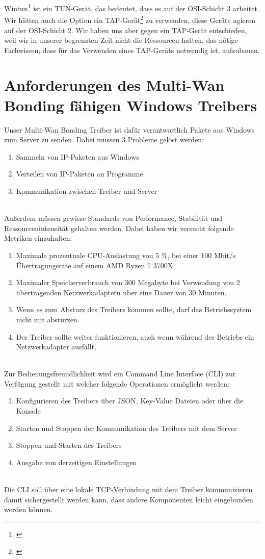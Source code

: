 \newpage
\noindent
Wintun\footnote[1]{\cite[Vgl.][]{1}} ist ein TUN-Gerät, das bedeutet, dass es auf der OSI-Schicht 3 arbeitet. Wir hätten auch die Option ein TAP-Gerät\footnote[2]{\cite[Vgl.][]{28}} zu verwenden, diese Geräte agieren auf der OSI-Schicht 2. Wir haben uns aber gegen ein TAP-Gerät entschieden, weil wir in unserer begrenzten Zeit nicht die Ressourcen hatten, das nötige Fachwissen, dass für das Verwenden eines TAP-Geräts notwendig ist, aufzubauen.

\section{Anforderungen des Multi-Wan Bonding fähigen Windows Treibers}

Unser Multi-Wan Bonding Treiber ist dafür verantwortlich Pakete aus Windows zum Server zu senden. Dabei müssen 3 Probleme gelöst werden:
\\
\begin{enumerate}
    \item Sammeln von IP-Paketen aus Windows
    \item Verteilen von IP-Paketen an Programme
    \item Kommunikation zwischen Treiber und Server
\end{enumerate}
\ \\
Außerdem müssen gewisse Standards von Performance, Stabilität und Ressourcenintensität gehalten werden. Dabei haben wir versucht folgende Metriken einzuhalten:
\\
\begin{enumerate}
    \item Maximale prozentuale CPU-Auslastung von 5 \%, bei einer 100 Mbit/s Übertragungsrate auf einem AMD Ryzen 7 3700X
    \item Maximaler Speicherverbrauch von 300 Megabyte bei Verwendung von 2 übertragenden Netzwerkadaptern über eine Dauer von 30 Minuten.
    \item Wenn es zum Absturz des Treibers kommen sollte, darf das Betriebssystem nicht mit abstürzen.
    \item Der Treiber sollte weiter funktionieren, auch wenn während des Betriebs ein Netzwerkadapter ausfällt.
\end{enumerate}
\ \\
Zur Bedienungsfreundlichkeit wird ein Command Line Interface (CLI)  zur Verfügung gestellt mit welcher folgende Operationen ermöglicht werden:
\\
\begin{enumerate}
    \item Konfigurieren des Treibers über JSON, Key-Value Dateien oder über die Konsole
    \item Starten und Stoppen der Kommunikation des Treibers mit dem Server
    \item Stoppen und Starten des Treibers
    \item Ausgabe von derzeitigen Einstellungen
\end{enumerate}
\ \\
Die CLI soll über eine lokale TCP-Verbindung mit dem Treiber kommunizieren damit sichergestellt werden kann, dass andere Komponenten leicht eingebunden werden können.

